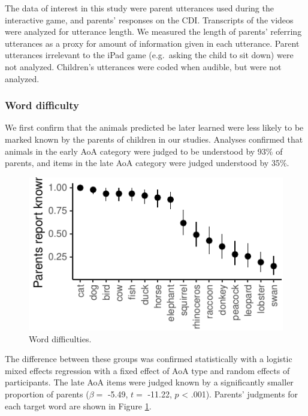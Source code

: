 \documentclass[10pt, letterpaper]{article}
\newenvironment{CodeChunk}{}{}
\begin{document}
The data of interest in this study were parent utterances used during
the interactive game, and parents' responses on the CDI. Transcripts of
the videos were analyzed for utterance length. We measured the length of
parents' referring utterances as a proxy for amount of information given
in each utterance. Parent utterances irrelevant to the iPad game
(e.g.~asking the child to sit down) were not analyzed. Children's
utterances were coded when audible, but were not analyzed.

\hypertarget{word-difficulty}{%
\subsubsection{Word difficulty}\label{word-difficulty}}

We first confirm that the animals predicted be later learned were less
likely to be marked known by the parents of children in our studies.
Analyses confirmed that animals in the early AoA category were judged to
be understood by 93\% of parents, and items in the late AoA category
were judged understood by 35\%.

\begin{CodeChunk}
\begin{figure}[tb]
\includegraphics{figs/difficulty_fig-1} \caption[Word difficulties]{Word difficulties.}\label{fig:difficulty_fig}
\end{figure}
\end{CodeChunk}

The difference between these groups was confirmed statistically with a
logistic mixed effects regression with a fixed effect of AoA type and
random effects of participants. The late AoA items were judged known by
a significantly smaller proportion of parents (\(\beta =\) -5.49,
\(t =\) -11.22, \(p\) \textless{} .001). Parents' judgments for each
target word are shown in Figure \ref{fig:difficulty_fig}.
\end{document}
